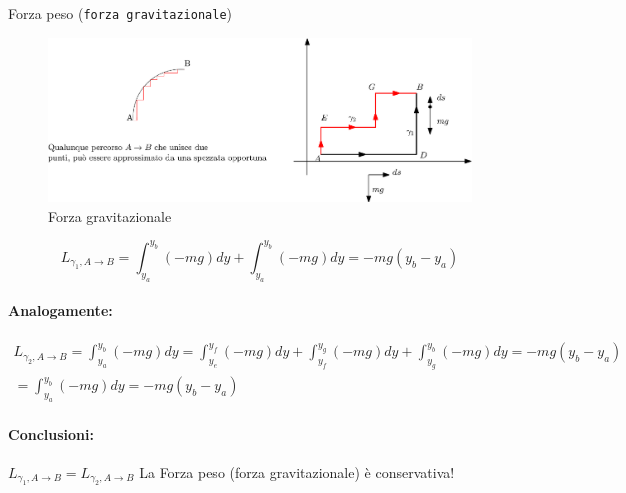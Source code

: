 \begin{esempio}
  Forza peso ({\tt forza gravitazionale})
 \begin{figure}[th]
    \centering
    \includegraphics[width=15cm]{img/finiti/forza_peso.eps}
    \caption{Forza gravitazionale}
  \end{figure}
  \begin{equation}
    L_{\gamma_1,A\to B}=\int_{y_a}^{y_b}(-mg)dy+\int_{y_a}^{y_b}(-mg)dy=-mg(y_b-y_a)
  \end{equation}
  \paragraph{Analogamente:}
  \begin{align*}
    L_{\gamma_2,A\to B}=\int_{y_a}^{y_b}(-mg)dy=\int_{y_e}^{y_f}(-mg)dy+
    \int_{y_f}^{y_g}(-mg)dy+\int_{y_g}^{y_b}(-mg)dy=-mg(y_b-y_a)\\=
    \int_{y_a}^{y_b}(-mg)dy=-mg(y_b-y_a)
  \end{align*}
  \paragraph{Conclusioni:} $L_{\gamma_1,A\to B}=L_{\gamma_2,A\to B}$ La Forza peso
  (forza gravitazionale) è conservativa!
\end{esempio}
